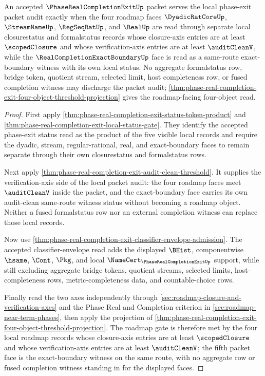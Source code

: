 \begin{theorem}
\label{thm:phase-real-completion-exit-scoped-audit-threshold}
An accepted $\PhaseRealCompletionExitUp$ packet serves the local phase-exit packet audit exactly when the four roadmap faces $\DyadicRatCoreUp$, $\StreamNameUp$, $\RegSeqRatUp$, and $\RealUp$ are read through separate local closurestatus and formalstatus records whose closure-axis entries are at least $\scopedClosure$ and whose verification-axis entries are at least $\auditCleanV$, while the $\RealCompletionExactBoundaryUp$ face is read as a same-route exact-boundary witness with its own local status. No aggregate formalstatus row, bridge token, quotient stream, selected limit, host completeness row, or fused completion witness may discharge the packet audit; \autoref{thm:phase-real-completion-exit-four-object-threshold-projection} gives the roadmap-facing four-object read.
\end{theorem}
\begin{proof}
First apply \autoref{thm:phase-real-completion-exit-status-token-product} and \autoref{thm:phase-real-completion-exit-local-status-gate}. They identify the accepted phase-exit status read as the product of the five visible local records and require the dyadic, stream, regular-rational, real, and exact-boundary faces to remain separate through their own closurestatus and formalstatus rows.

Next apply \autoref{thm:phase-real-completion-exit-audit-clean-threshold}. It supplies the verification-axis side of the local packet audit: the four roadmap faces meet $\auditCleanV$ inside the packet, and the exact-boundary face carries its own audit-clean same-route witness status without becoming a roadmap object. Neither a fused formalstatus row nor an external completion witness can replace those local records.

Now use \autoref{thm:phase-real-completion-exit-classifier-envelope-admission}. The accepted classifier-envelope read adds the displayed $\BHist$, componentwise $\hsame$, $\Cont$, $\Pkg$, and local $\NameCert_{\PhaseRealCompletionExitUp}$ support, while still excluding aggregate bridge tokens, quotient streams, selected limits, host-completeness rows, metric-completeness data, and countable-choice rows.

Finally read the two axes independently through \autoref{sec:roadmap-closure-and-verification-axes} and the Phase Real and Completion criterion in \autoref{sec:roadmap-near-term-phases}, then apply the projection of \autoref{thm:phase-real-completion-exit-four-object-threshold-projection}. The roadmap gate is therefore met by the four local roadmap records whose closure-axis entries are at least $\scopedClosure$ and whose verification-axis entries are at least $\auditCleanV$; the fifth packet face is the exact-boundary witness on the same route, with no aggregate row or fused completion witness standing in for the displayed faces.
\end{proof}

